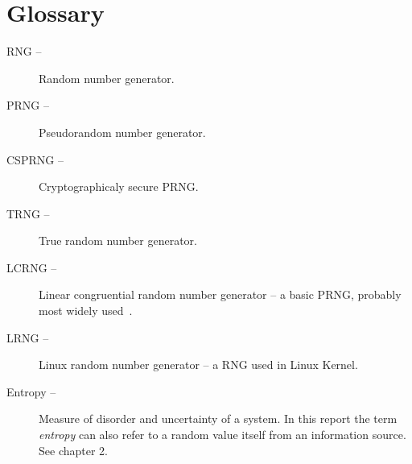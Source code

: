 \chapter{Glossary}\label{chap:glossary}

\begin{description}
 \item [RNG --] Random number generator.
 \item [PRNG --] Pseudorandom number generator.
 \item [CSPRNG --] Cryptographicaly secure PRNG.
 \item [TRNG --] True random number generator.
 \item [LCRNG --] Linear congruential random number generator -- a basic PRNG,
 	probably most widely used~\cite[p.~151]{CryptographyAndNetworkSecurity}.
 \item [LRNG --] Linux random number generator -- a RNG used in Linux Kernel.
 \item [Entropy --] Measure of disorder and uncertainty of a system. 
 	In this report the term {\em entropy} can also refer to a random value itself 
	from an information source. See chapter 2.
\end{description}
